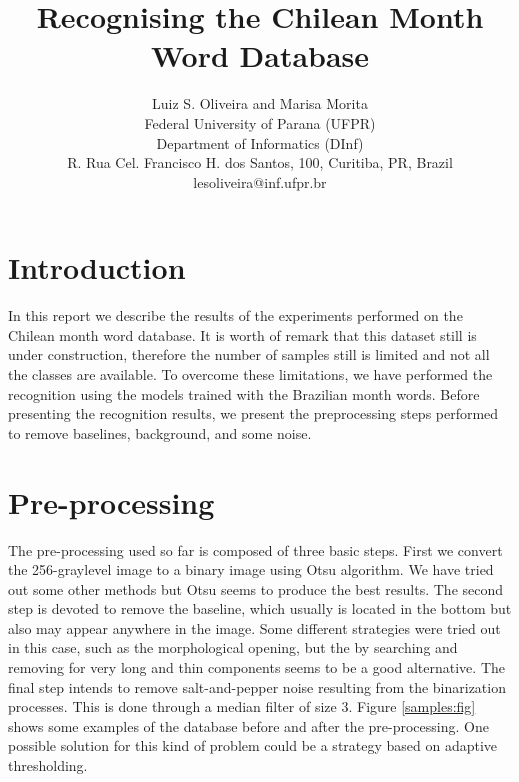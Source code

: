 \documentclass{article}[14pt, oneside, a4paper, times]
\begin{document}
\title{Recognising the Chilean Month Word Database}
\author{Luiz S. Oliveira and Marisa Morita  
\\
\vspace {-10pt}
Federal University of Parana (UFPR)\\
\vspace {-10pt}
Department of Informatics (DInf)\\
\vspace {-10pt}
R. Rua Cel. Francisco H. dos Santos, 100, Curitiba, PR, Brazil \\
lesoliveira@inf.ufpr.br \\ 
}


\date{}
\maketitle
\thispagestyle{empty}





\section{Introduction} 

In this report we describe the results of the experiments performed on the Chilean month word database. It is worth of remark that this dataset still is under construction, therefore the number of samples still is limited and not all the classes are available. To overcome these limitations, we have performed the recognition using the models trained with the Brazilian month words. Before presenting the recognition results, we present the preprocessing steps performed to remove baselines, background, and some noise.

\section{Pre-processing}

The pre-processing used so far is composed of three basic steps. First we convert the 256-graylevel image to a binary image using Otsu algorithm. We have tried out some other methods but Otsu seems to produce the best results. The second step is devoted to remove the baseline, which usually is located in the bottom but also may appear anywhere in the image. Some different strategies were tried out in this case, such as the morphological opening, but the by searching and removing for very long and thin components seems to be a good alternative. The final step intends to remove salt-and-pepper noise resulting from the binarization processes. This is done through a median filter of size 3. Figure \ref{samples:fig} shows some examples of the database before and after the pre-processing. One possible solution for this kind of problem could be a strategy based on adaptive thresholding.  
\end{document}
